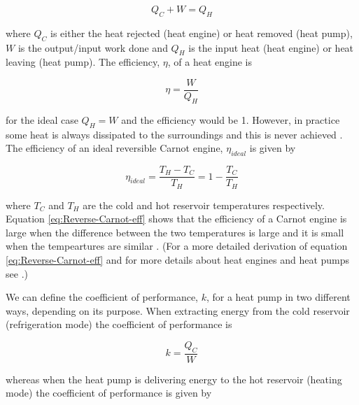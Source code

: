 \documentclass{article}
\begin{document}
\begin{equation}
\label{eq:Energy-Conservation}
Q_C + W = Q_H
\end{equation}

\vspace{2mm}
\noindent
where $Q_C$ is either the heat rejected (heat engine) or heat removed (heat pump), $W$ is the output/input work done and $Q_H$ is the input heat (heat engine) or heat leaving (heat pump). The efficiency, $\eta$, of a heat engine is

\begin{equation}
\label{eq:Heat-eff}
\eta = \frac{W}{Q_H}
\end{equation}

\vspace{2mm}
\noindent
for the ideal case $Q_H = W$ and the efficiency would be 1. However, in practice some heat is always dissipated to the surroundings and this is never achieved \cite{Book02}. The efficiency of an ideal reversible Carnot engine, $\eta_{ideal}$ is given by

\begin{equation}
\label{eq:Reverse-Carnot-eff}
\eta_{ideal} = \frac{T_H - T_C}{T_H} = 1 - \frac{T_C}{T_H}
\end{equation}

\vspace{2mm}
\noindent
where $T_C$ and $T_H$ are the cold and hot reservoir temperatures respectively. Equation \eqref{eq:Reverse-Carnot-eff} shows that the efficiency of a Carnot engine is large when the difference between the two temperatures is large and it is small when the tempeartures are similar \cite{Book02}. (For a more detailed derivation of equation \eqref{eq:Reverse-Carnot-eff} and for more details about heat engines and heat pumps see \cite{Book02}.)

\vspace{2mm}
\noindent
We can define the coefficient of performance, $k$, for a heat pump in two different ways, depending on its purpose. When extracting energy from the cold reservoir (refrigeration mode) the coefficient of performance is

\begin{equation}
\label{eq:Rerigeration}
k = \frac{Q_C}{W}
\end{equation}

\vspace{2mm}
\noindent
whereas when the heat pump is delivering energy to the hot reservoir (heating mode) the coefficient of performance is given by
\end{document}
